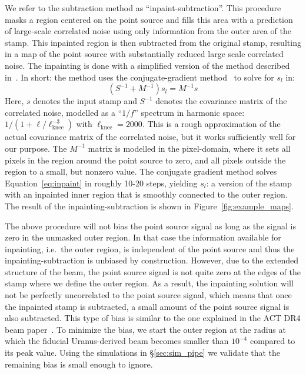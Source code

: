 We refer to the subtraction method as ``inpaint-subtraction''. This procedure masks a region centered on the point source and fills this area with a prediction of large-scale correlated noise using only information from the outer area of the stamp. This inpainted region is then subtracted from the original stamp, resulting in a map of the point source with substantially reduced large scale correlated noise. The inpainting is done with a simplified version of the method described in~\cite{bucher_2012}. In short: the method uses the conjugate-gradient method~\cite{Shewchuk_1994} to solve for $s_l$ in:
\begin{equation}\label{eq:inpaint}
\left(S^{-1} + M^{-1} \right) s_l = M^{-1} s
\end{equation}
Here, $s$ denotes the input stamp and $S^{-1}$ denotes the covariance matrix of the correlated noise, modelled as a ``$1/f$'' spectrum in harmonic space: $1/ (1 + \ell / \ell_{\mathrm{knee}}^{-3})$ with $\ell_{\mathrm{knee}} = 2000$. This is a rough approximation of the actual covariance matrix of the correlated noise, but it works sufficiently well for our purpose. The $M^{-1}$ matrix is modelled in the pixel-domain, where it sets all pixels in the region around the point source to zero, and all pixels outside the region to a small, but nonzero value. The conjugate gradient method solves Equation~\ref{eq:inpaint} in roughly 10-20 steps, yielding $s_l$: a version of the stamp with an inpainted inner region that is smoothly connected to the outer region. The result of the inpainting-subtraction is shown in Figure~\ref{fig:example_maps}.

The above procedure will not bias the point source signal as long as the signal is zero in the unmasked outer region. In that case the information available for inpainting, i.e.\ the outer region, is independent of the point source and thus the inpainting-subtraction is unbiased by construction. However, due to the extended structure of the beam, the point source signal is not quite zero at the edges of the stamp where we define the outer region. As a result, the inpainting solution will not be perfectly uncorrelated to the point source signal, which means that once the inpainted stamp is subtracted, a small amount of the point source signal is also subtracted. This type of bias is similar to the one explained in the ACT DR4 beam paper~\cite{Lungu_2022}. To minimize the bias, we start the outer region at the radius at which the fiducial Uranus-derived beam becomes smaller than $10^{-4}$ compared to its peak value. Using the simulations in \S\ref{sec:sim_pipe} we validate that the remaining bias is small enough to ignore.
 
